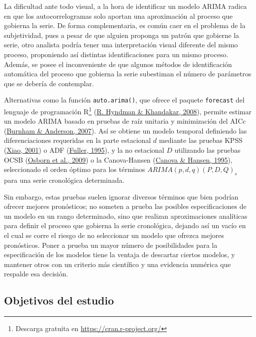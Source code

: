 \documentclass[
]{article}
\begin{document}
La dificultad ante todo visual, a la hora de identificar un modelo ARIMA
radica en que los autocorrelogramas solo aportan una aproximación al
proceso que gobierna la serie. De forma complementaria, es común caer en
el problema de la subjetividad, pues a pesar de que alguien proponga un
patrón que gobierne la serie, otro analista podría tener una
interpretación visual diferente del mismo proceso, proponiendo así
distintas identificaciones para un mismo proceso. Además, se posee el
inconveniente de que algunos métodos de identificación automática del
proceso que gobierna la serie subestiman el número de parámetros que se
debería de contemplar.

Alternativas como la función \texttt{auto.arima()}, que ofrece el
paquete \texttt{forecast} del lenguaje de programación R\footnote{Descarga
  gratuita en \url{https://cran.r-project.org/}}
(\protect\hyperlink{ref-auto.arima}{R. Hyndman \& Khandakar, 2008}),
permite estimar un modelo ARIMA basado en pruebas de raíz unitaria y
minimización del AICc (\protect\hyperlink{ref-burnham2007model}{Burnham
\& Anderson, 2007}). Así se obtiene un modelo temporal definiendo las
diferenciaciones requeridas en la parte estacional \(d\) mediante las
pruebas KPSS
(\protect\hyperlink{ref-doi:10.1111ux2f1467-9892.00213}{Xiao, 2001}) o
ADF (\protect\hyperlink{ref-fuller1995introduction}{Fuller, 1995}), y la
no estacional \(D\) utilizando las pruebas OCSB
(\protect\hyperlink{ref-Osborn2009SEASONALITYAT}{Osborn et al., 2009}) o
la Canova-Hansen (\protect\hyperlink{ref-10.2307ux2f1392184}{Canova \&
Hansen, 1995}), seleccionado el orden óptimo para los términos
\(ARIMA(p, d, q)(P, D, Q)_s\) para una serie cronológica determinada.

Sin embargo, estas pruebas suelen ignorar diversos términos que bien
podrían ofrecer mejores pronósticos; no someten a prueba las posibles
especificaciones de un modelo en un rango determinado, sino que realizan
aproximaciones analíticas para definir el proceso que gobierna la serie
cronológica, dejando así un vacío en el cual se corre el riesgo de no
seleccionar un modelo que ofrezca mejores pronósticos. Poner a prueba un
mayor número de posibilidades para la especificación de los modelos
tiene la ventaja de descartar ciertos modelos, y mantener otros con un
criterio más científico y una evidencia numérica que respalde esa
decisión.

\subsection{Objetivos del estudio}
\end{document}
